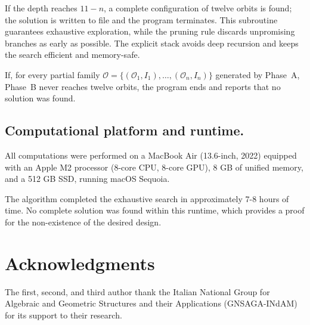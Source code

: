 \documentclass[a4paper, 11pt]{article}
\theoremstyle{definition}
\theoremstyle{definition}
\theoremstyle{definition}
\numberwithin{equation}{section}
\begin{document}
If the depth reaches $11-n$, a complete configuration of twelve orbits is
found; the solution is written to file and the program terminates. This
subroutine guarantees exhaustive exploration, while the pruning rule discards
unpromising branches as early as possible. The explicit stack avoids deep
recursion and keeps the search efficient and memory-safe.

If, for every partial family $\mathcal{O}=\{(\mathcal{O}_1,I_1),\dots,(\mathcal{O}_n,I_n)\}$
generated by Phase~A, Phase~B never reaches twelve orbits, the program ends and
reports that no solution was found.

\subsection{Computational platform and runtime.}
All computations were performed on a MacBook Air (13.6-inch, 2022) equipped with an Apple M2 processor (8-core CPU, 8-core GPU), 8 GB of unified memory, and a 512 GB SSD, running macOS Sequoia.  

The algorithm completed the exhaustive search in approximately 7-8 hours of time. No complete solution was found within this runtime, which provides a proof for the non-existence of the desired design.

\section*{Acknowledgments}
The first, second, and third author thank the Italian National Group for Algebraic and Geometric Structures and their Applications (GNSAGA-INdAM) for its support to their research.
\end{document}
